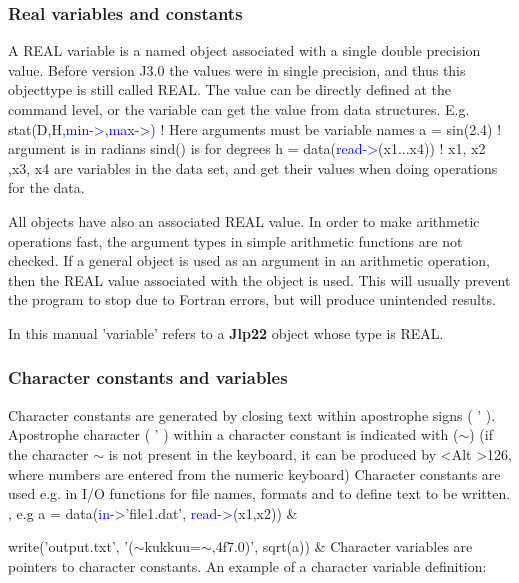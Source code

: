 \subsubsection{Real variables and constants}
\label{realo}
A REAL variable is a named object associated with a single
double precision value. Before version J3.0 the values were in single
precision, and thus this objecttype is still called REAL.
The
value can be directly defined at the command level, or the variable can get
the value from data structures.  E.g.
\textcolor{VioletRed}{stat}(D,H,\textcolor{blue}{min->},\textcolor{blue}{max->}) ! Here arguments must be variable names
a = \textcolor{VioletRed}{sin}(2.4) ! argument is in radians \textcolor{VioletRed}{sind}() is for degrees
h = \textcolor{VioletRed}{data}(\textcolor{blue}{read->}(x1...x4))   ! x1, x2 ,x3, x4 are variables in the data set, and
get their values when doing operations for the data.


\begin{note}
All objects have also an associated REAL value. In order to make
arithmetic operations fast, the argument types in simple arithmetic functions
are not checked. If a general object is used as an argument in an arithmetic
operation, then the REAL value associated with the object is used. This will
usually prevent the program to stop due to Fortran errors, but will produce
unintended results.
\end{note}

\begin{note}
In this manual 'variable' refers to a \textbf{Jlp22} object whose type is REAL.
\end{note}
\subsubsection{Character constants and variables}
\label{charo}
Character constants are generated by closing text within apostrophe signs ( '
). Apostrophe character ( ' ) within a character constant is indicated with ($\sim$)
(if the character $\sim$ is not present in the keyboard, it can be produced by <Alt
>126, where numbers are entered from the numeric keyboard) Character constants are used e.g.  in I/O functions for file names, formats
and to define text to be written.  , e.g
a = \textcolor{VioletRed}{data}(\textcolor{blue}{in->}'file1.dat', \textcolor{blue}{read->}(x1,x2)) &

\textcolor{VioletRed}{write}('output.txt', '($\sim$kukkuu=$\sim$,4f7.0)', \textcolor{VioletRed}{sqrt}(a)) &
Character variables are pointers to character constants. An example of a
character variable definition:


